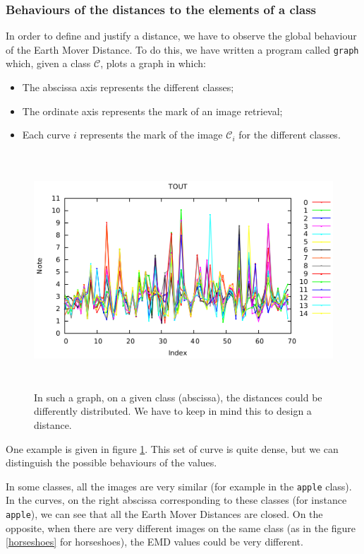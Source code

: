 \subsubsection{Behaviours of the distances to the elements of a class}

In order to define and justify a distance, we have to observe the global behaviour of the Earth Mover Distance. To do this, we have written a program called \texttt{graph} which, given a class $\mathcal{C}$, plots a graph in which:
\begin{itemize}
	\item The abscissa axis represents the different classes;
	\item The ordinate axis represents the mark of an image retrieval;
	\item Each curve $i$ represents the mark of the image $\mathcal{C}_i$ for the different classes. 
\end{itemize}

\begin{figure}[!ht]
    \centering
    \includegraphics[height=250pt]{images/plot_1.eps}
	\caption{In such a graph, on a given class (abscissa), the distances could be differently distributed. We have to keep in mind this to design a distance.}
	\label{graph}
\end{figure}


One example is given in figure \ref{graph}. This set of curve is quite dense, but we can distinguish the possible behaviours of the values.

In some classes, all the images are very similar (for example in the \texttt{apple} class). In the curves, on the right abscissa corresponding to these classes (for instance \texttt{apple}), we can see that all the Earth Mover Distances are closed. On the opposite, when there are very different images on the same class (as in the figure \ref{horseshoes} for horseshoes), the EMD values could be very different.

